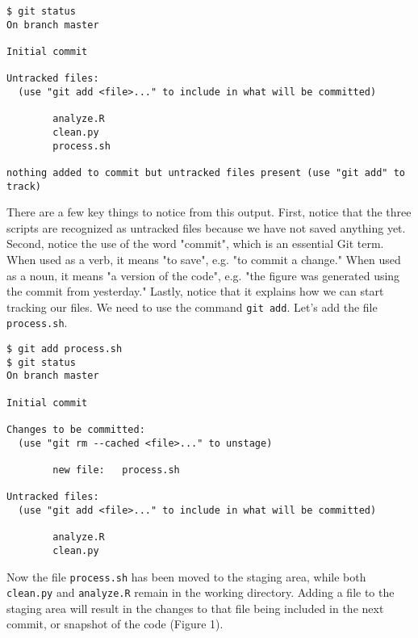 \begin{lstlisting}
$ git status
On branch master

Initial commit

Untracked files:
  (use "git add <file>..." to include in what will be committed)

        analyze.R
        clean.py
        process.sh

nothing added to commit but untracked files present (use "git add" to track)
\end{lstlisting}

There are a few key things to notice from this output.
First, notice that the three scripts are recognized as untracked files because we have not saved anything yet.
Second, notice the use of the word "commit", which is an essential Git term.
When used as a verb, it means "to save", e.g. "to commit a change."
When used as a noun, it means "a version of the code", e.g. "the figure was generated using the commit from yesterday."
Lastly, notice that it explains how we can start tracking our files.
We need to use the command \verb|git add|.
Let's add the file \verb|process.sh|.

\begin{lstlisting}
$ git add process.sh
$ git status
On branch master

Initial commit

Changes to be committed:
  (use "git rm --cached <file>..." to unstage)

        new file:   process.sh

Untracked files:
  (use "git add <file>..." to include in what will be committed)

        analyze.R
        clean.py
\end{lstlisting}

Now the file \verb|process.sh| has been moved to the staging area, while both \verb|clean.py| and \verb|analyze.R| remain in the working directory.
Adding a file to the staging area will result in the changes to that file being included in the next commit, or snapshot of the code (Figure 1).
